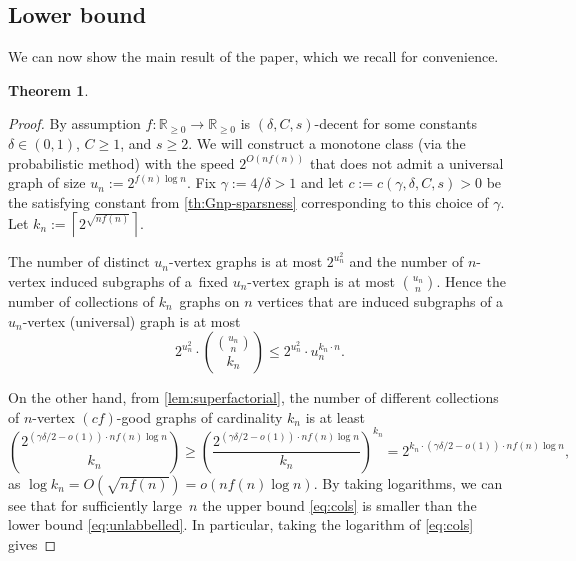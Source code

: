 \documentclass[letterpaper,11pt]{article}
\newcommand{\dec}{decent\xspace}
\newcommand{\Rrr}{\mathbb{R}_{\geq 0}}
\newtheorem{theorem}{Theorem}[section]
\theoremstyle{definition}
\theoremstyle{remark}
\renewcommand{\leq}{\leqslant}
\renewcommand{\geq}{\geqslant}
\begin{document}
 
	\subsection{Lower bound}\label{subsec:lower}
	
	
		We can now show the main result of the paper, which we recall for convenience.
	
	{\renewcommand{\thetheorem}{\ref{th:main}}
		\begin{theorem}
			\lowerbound	
	\end{theorem}}
	\addtocounter{theorem}{-1}
	\begin{proof}	
By assumption $f : \Rrr \rightarrow \Rrr$ is $(\delta,C,s)$-\dec  for some constants $\delta \in (0,1)$, $C\geq 1$, and $s\geq 2$. 	We will construct a monotone class (via the probabilistic method) with the speed $2^{O(n f(n))}$ that does not admit a universal graph of size $u_n := 2^{ f(n)\log n}$.  Fix $\gamma := 4/\delta >1$ and let $c:=c(\gamma, \delta,C,s)>0$ be the satisfying constant from \cref{th:Gnp-sparsness} corresponding to this choice of $\gamma$. Let $k_n := \left\lceil 2^{\sqrt{nf(n)}} \right\rceil$.
		
		The number of distinct $u_n$-vertex graphs is at most $2^{u_n^2}$ and 
		the number of $n$-vertex induced subgraphs of a~fixed $u_n$-vertex graph 
		is at most $\binom{u_n}{n}$.
		Hence the number of collections of $k_n$~graphs on $n$ vertices that are
		induced subgraphs of a~$u_n$-vertex (universal) graph is at most 
		\begin{equation}\label{eq:cols} 
			2^{u_n^2}\cdot \binom{\binom{u_n}{n}}{k_n}\leq  2^{u_n^2}\cdot u_n^{k_n \cdot n}.  
		\end{equation} 
		
		
		On the other hand, from \cref{lem:superfactorial}, the number of different collections of $n$-vertex $(cf)$-good graphs of cardinality $k_n$ is at least 
		\begin{equation}\label{eq:unlabbelled}
			\binom{2^{(\gamma \delta /2-o(1))\cdot n f(n) \log n}}{k_n} 	\geq \left(\frac{2^{(\gamma \delta /2-o(1))\cdot n f(n) \log n}}{k_n} \right)^{k_n} = 2^{k_n \cdot (\gamma \delta/2-o(1))\cdot n f(n) \log n},
		\end{equation} 
		as $\log k_n = O(\sqrt{nf(n)})  = o(n f(n)  \log n)$. 
		By taking logarithms, we can see
		that for sufficiently large~$n$ the upper bound \eqref{eq:cols} is smaller than the lower bound \eqref{eq:unlabbelled}. In particular, taking the logarithm of \eqref{eq:cols} gives 
		

\end{proof}
\end{document}
